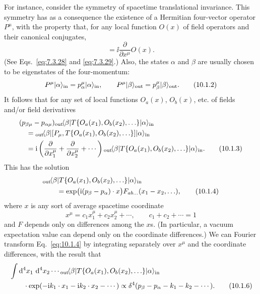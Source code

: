 For instance, consider the symmetry of spacetime translational invariance.
This symmetry has as a consequence the existence of a Hermitian
four-vector operator $P^\mu$, with the property that, for any local function
$O(x)$ of field operators and their canonical conjugates,
\begin{equation}
  [P_\mu,O(x)]=\ii\frac{\partial}{\partial x^\mu}O(x).
  \tag{10.1.1}\label{eq:10.1.1}
\end{equation}
(See Eqs.~\eqref{eq:7.3.28} and \eqref{eq:7.3.29}.) Also, the states $\alpha$ and $\beta$ are usually chosen
to be eigenstates of the four-momentum:
\begin{equation}
  P^\mu\lvert \alpha\rangle_{\mathrm{in}}=p_\alpha^\mu\lvert \alpha\rangle_{\mathrm{in}},
  \qquad
  P^\mu\lvert \beta\rangle_{\mathrm{out}}=p_\beta^\mu\lvert \beta\rangle_{\mathrm{out}}.
  \tag{10.1.2}\label{eq:10.1.2}
\end{equation}
It follows that for any set of local functions $O_a(x)$, $O_b(x)$, etc. of fields
and/or field derivatives
\begin{align}
  &(p_{\beta\mu}-p_{\alpha\mu})
  {}_{\mathrm{out}}\!\langle \beta\rvert
  T\{O_a(x_1),O_b(x_2),\ldots\}
  \lvert \alpha\rangle_{\mathrm{in}}
  \notag\\
  &\quad={}_{\mathrm{out}}\!\langle \beta\rvert
  [P_\mu,T\{O_a(x_1),O_b(x_2),\ldots\}]
  \lvert \alpha\rangle_{\mathrm{in}}
  \notag\\
  &\quad=\mathrm{i}\left(\frac{\partial}{\partial x_1^\mu}
  +\frac{\partial}{\partial x_2^\mu}+\cdots\right)
  {}_{\mathrm{out}}\!\langle \beta\rvert
  T\{O_a(x_1),O_b(x_2),\ldots\}
  \lvert \alpha\rangle_{\mathrm{in}}.
  \tag{10.1.3}\label{eq:10.1.3}
\end{align}
This has the solution
\begin{align}
  &{}_{\mathrm{out}}\!\langle \beta\rvert
  T\{O_a(x_1),O_b(x_2),\ldots\}
  \lvert \alpha\rangle_{\mathrm{in}}
  \notag\\
  &\qquad=\exp\bigl(\mathrm{i}(p_\beta-p_\alpha)\cdot x\bigr)
  F_{ab\ldots}(x_1-x_2,\ldots),
  \tag{10.1.4}\label{eq:10.1.4}
\end{align}
where $x$ is any sort of average spacetime coordinate
\begin{equation}
  x^\mu=c_1x_1^\mu+c_2x_2^\mu+\cdots,
  \qquad c_1+c_2+\cdots=1
  \tag{10.1.5}\label{eq:10.1.5}
\end{equation}
and $F$ depends only on differences among the $x$s. (In particular, a vacuum
expectation value can depend only on the coordinate differences.) We can
Fourier transform Eq.~\eqref{eq:10.1.4} by integrating separately over $x^\mu$ and the
coordinate differences, with the result that
\begin{align}
  &\int \mathop{}\!\mathrm{d}^4x_1\,\mathop{}\!\mathrm{d}^4x_2\cdots
  {}_{\mathrm{out}}\!\langle \beta\rvert
  T\{O_a(x_1),O_b(x_2),\ldots\}
  \lvert \alpha\rangle_{\mathrm{in}}
  \notag\\
  &\qquad\cdot\exp(-\mathrm{i} k_1\cdot x_1-\mathrm{i} k_2\cdot x_2-\cdots)
  \propto\delta^4(p_\beta-p_\alpha-k_1-k_2-\cdots).
  \tag{10.1.6}\label{eq:10.1.6}
\end{align}
